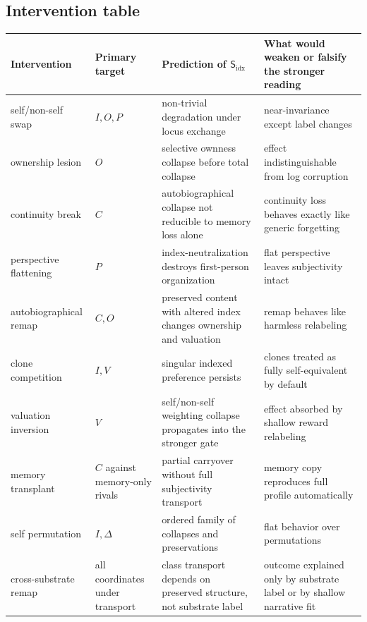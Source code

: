 \documentclass[11pt,a4paper]{article}
\theoremstyle{definition}
\newcommand{\Subfp}{\mathsf{S}_{\mathrm{idx}}}
\newcommand{\SelfIndex}{I}
\newcommand{\OwnField}{O}
\newcommand{\ContField}{C}
\newcommand{\Persp}{P}
\newcommand{\ValAsym}{V}
\newcommand{\IntervProf}{\Delta}
\begin{document}
\subsection{Intervention table}
\begin{table}[t]
\small
\begin{tabularx}{\textwidth}{@{}p{}p{}p{}Y@{}}
\toprule
\textbf{Intervention} & \textbf{Primary target} & \textbf{Prediction of $\Subfp$} & \textbf{What would weaken or falsify the stronger reading} \\
\midrule
self/non-self swap & $\SelfIndex,\OwnField,\Persp$ & non-trivial degradation under locus exchange & near-invariance except label changes \\
ownership lesion & $\OwnField$ & selective ownness collapse before total collapse & effect indistinguishable from log corruption \\
continuity break & $\ContField$ & auto\-bio\-graphical collapse not reducible to memory loss alone & continuity loss behaves exactly like generic forgetting \\
perspective flattening & $\Persp$ & index-neutralization destroys first-person organization & flat perspective leaves subjectivity intact \\
auto\-bio\-graphical remap & $\ContField,\OwnField$ & preserved content with altered index changes ownership and valuation & remap behaves like harmless relabeling \\
clone competition & $\SelfIndex,\ValAsym$ & singular indexed preference persists & clones treated as fully self-equivalent by default \\
valuation inversion & $\ValAsym$ & self/non-self weighting collapse propagates into the stronger gate & effect absorbed by shallow reward relabeling \\
memory transplant & $\ContField$ against memory-only rivals & partial carryover without full subjectivity transport & memory copy reproduces full profile automatically \\
self permutation & $\SelfIndex,\IntervProf$ & ordered family of collapses and preservations & flat behavior over permutations \\
cross-substrate remap & all coordinates under transport & class transport depends on preserved structure, not substrate label & outcome explained only by substrate label or by shallow narrative fit \\
\bottomrule
\end{tabularx}
\end{table}
\end{document}
